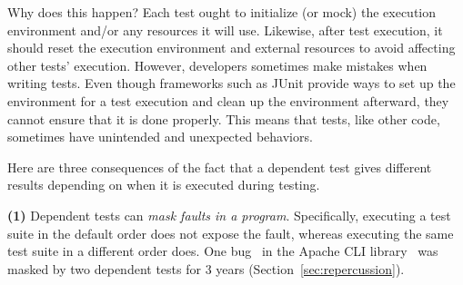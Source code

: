 
Why does this happen?
Each test ought to initialize (or mock) the execution environment
and/or any resources it will use.
Likewise, after test execution, it should reset the
execution environment and external resources
to avoid affecting other tests' execution.
However, developers sometimes
make mistakes when writing tests.
Even though frameworks such as
JUnit provide ways to set up the environment for a test execution and clean
up the environment afterward,
they cannot ensure that it is done
properly. This means that tests, like other code,
sometimes have unintended and unexpected behaviors.



%
%




Here are three consequences of the fact that a dependent
test gives different results depending on when it is executed
during testing.

\textbf{(1)}
Dependent tests can
\emph{mask faults in a program}. Specifically, executing a test suite in the
default order does not expose the fault, whereas
executing the same test suite in a different order does. 
One bug~\cite{clibug} in the Apache CLI library~\cite{cli}
was masked by two dependent tests
for 3 years (Section~\ref{sec:repercussion}).


